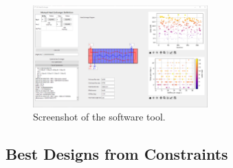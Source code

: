 \documentclass{article}
\begin{document}
\begin{figure}[H]
  \centering
  \includegraphics[width=0.6\textwidth]{software.png}
  \caption{Screenshot of the software tool.}
  \label{fig:software}
\end{figure}

\subsection{Best Designs from Constraints}
\end{document}
